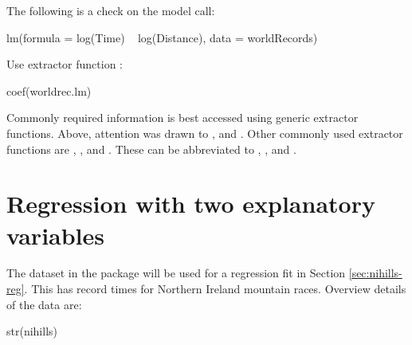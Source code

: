 The following is a check on the model call:
\begin{fullwidth}

\begin{Schunk}
\begin{Soutput}
lm(formula = log(Time) ~ log(Distance), data = worldRecords)
\end{Soutput}
\end{Schunk}

\end{fullwidth}

\begin{marginfigure}[40pt]
Use extractor function :\\[-3pt]
\begin{Schunk}
\begin{Sinput}
coef(worldrec.lm)
\end{Sinput}
\end{Schunk}
\end{marginfigure}
Commonly required information is best accessed using generic
extractor functions.  Above, attention was drawn to ,
 and .  Other commonly used extractor
functions are , , and
. These can be abbreviated to ,
, and .

\section{Regression with two explanatory variables}\label{sec:nihills}

The dataset  in the  package will be used for
a regression fit in Section \ref{sec:nihills-reg}.  This has record
times for Northern Ireland mountain races. Overview details of the
data are:
\begin{fullwidth}
\begin{Schunk}
\begin{Sinput}
str(nihills)
\end{Sinput}
\end{Schunk}
\end{fullwidth}



